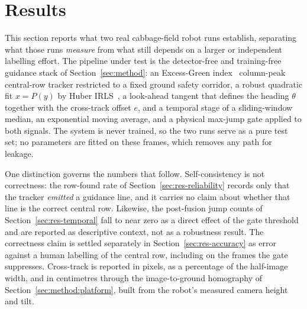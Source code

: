 
\section{Results}
\label{sec:results}

This section reports what two real cabbage-field robot runs establish, separating
what those runs \emph{measure} from what still depends on a larger or independent
labelling effort. The pipeline under test is the detector-free and training-free
guidance stack of Section~\ref{sec:method}: an Excess-Green
index~\cite{woebbecke1995,meyer2008} column-peak central-row tracker restricted to
a fixed ground safety corridor, a robust quadratic fit $x=P(y)$ by Huber
IRLS~\cite{huber1964}, a look-ahead tangent that defines the heading $\theta$
together with the cross-track offset $e$, and a temporal stage of a sliding-window
median, an exponential moving average, and a physical max-jump gate applied to
both signals. The system is never trained, so the two runs serve as a pure test
set; no parameters are fitted on these frames, which removes any path for leakage.

One distinction governs the numbers that follow. Self-consistency is not
correctness: the row-found rate of Section~\ref{sec:res-reliability} records only
that the tracker \emph{emitted} a guidance line, and it carries no claim about
whether that line is the correct central row. Likewise, the post-fusion jump
counts of Section~\ref{sec:res-temporal} fall to near zero as a direct effect of
the gate threshold and are reported as descriptive context, not as a robustness
result. The correctness claim is settled separately in
Section~\ref{sec:res-accuracy} as error against a human labelling of the central
row, including on the frames the gate suppresses. Cross-track is reported in
pixels, as a percentage of the half-image width, and in centimetres through the
image-to-ground homography of Section~\ref{sec:method:platform}, built from the
robot's measured camera height and tilt.

